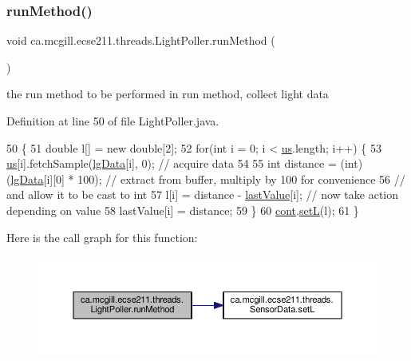 \subsubsection{\texorpdfstring{run\+Method()}{runMethod()}}
{\footnotesize\ttfamily void ca.\+mcgill.\+ecse211.\+threads.\+Light\+Poller.\+run\+Method (\begin{DoxyParamCaption}{ }\end{DoxyParamCaption})\hspace{0.3cm}{\ttfamily [protected]}}

the run method to be performed in run method, collect light data 

Definition at line 50 of file Light\+Poller.\+java.


\begin{DoxyCode}
50                              \{
51     \textcolor{keywordtype}{double} l[] = \textcolor{keyword}{new} \textcolor{keywordtype}{double}[2];
52     \textcolor{keywordflow}{for}(\textcolor{keywordtype}{int} i = 0; i < \hyperlink{classca_1_1mcgill_1_1ecse211_1_1threads_1_1_light_poller_ab6a9cb770bbf71f586697633db1475ff}{us}.length; i++) \{
53       \hyperlink{classca_1_1mcgill_1_1ecse211_1_1threads_1_1_light_poller_ab6a9cb770bbf71f586697633db1475ff}{us}[i].fetchSample(\hyperlink{classca_1_1mcgill_1_1ecse211_1_1threads_1_1_light_poller_a6cf53aecc3efc481f71d36341d2276c6}{lgData}[i], 0); \textcolor{comment}{// acquire data}
54   
55       \textcolor{keywordtype}{int} distance = (int) (\hyperlink{classca_1_1mcgill_1_1ecse211_1_1threads_1_1_light_poller_a6cf53aecc3efc481f71d36341d2276c6}{lgData}[i][0] * 100); \textcolor{comment}{// extract from buffer, multiply by 100 for
       convenience}
56                                               \textcolor{comment}{// and allow it to be cast to int}
57       l[i] = distance - \hyperlink{classca_1_1mcgill_1_1ecse211_1_1threads_1_1_light_poller_a79908bf56395ae82ab5ac57b5b40f206}{lastValue}[i]; \textcolor{comment}{// now take action depending on value}
58       lastValue[i] = distance; 
59     \}
60     \hyperlink{classca_1_1mcgill_1_1ecse211_1_1threads_1_1_light_poller_ab6a9050ced4f6940add4735c8872194a}{cont}.\hyperlink{classca_1_1mcgill_1_1ecse211_1_1threads_1_1_sensor_data_af905a6f2825716ae1a39bf7f6be09477}{setL}(l);
61   \}
\end{DoxyCode}
Here is the call graph for this function\+:\nopagebreak
\begin{figure}[H]
\begin{center}
\leavevmode
\includegraphics[width=350pt]{classca_1_1mcgill_1_1ecse211_1_1threads_1_1_light_poller_aab90a460a4d0c926fb8f3930492a8fb1_cgraph}
\end{center}
\end{figure}


